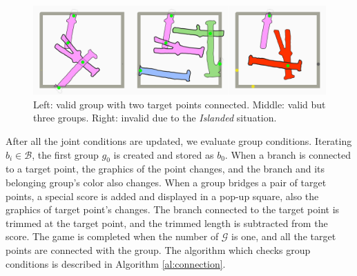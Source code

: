 \begin{figure}[ht]
  \begin{center}
    \includegraphics[width = 0.4\paperwidth]{images/interface/groups.jpg}
    \caption{Left: valid group with two target points connected. Middle: valid but three groups. Right: invalid due to the \textit{Islanded} situation. }
    \label{fig:group}
  \end{center}
\end{figure}


After all the joint conditions are updated, we evaluate group conditions.
Iterating $b_i \in \mathcal{B}$, the first group $g_0$ is created and stored as $b_0$.
When a branch is connected to a target point, the graphics of the point changes, and the branch and its belonging group's color also changes.
When a group bridges a pair of target points, a special score is added and displayed in a pop-up square, also the graphics of target point's changes.
The branch connected to the target point is trimmed at the target point, and the trimmed length is subtracted from the score.
The game is completed when the number of $\mathcal{G}$ is one, and all the target points are connected with the group.
The algorithm which checks group conditions is described in Algorithm \ref{al:connection}.

